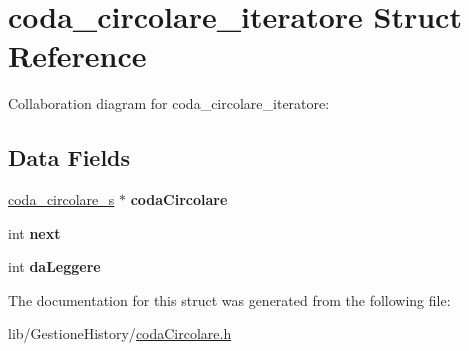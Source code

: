 \hypertarget{structcoda__circolare__iteratore}{}\section{coda\+\_\+circolare\+\_\+iteratore Struct Reference}
\label{structcoda__circolare__iteratore}


Collaboration diagram for coda\+\_\+circolare\+\_\+iteratore\+:
\subsection*{Data Fields}
\begin{DoxyCompactItemize}
\item 
\mbox{\label{structcoda__circolare__iteratore_adb37d558055c25504b8ec21a4388931b}} 
\hyperlink{structcoda__circolare}{coda\+\_\+circolare\+\_\+s} $\ast$ {\bfseries coda\+Circolare}
\item 
\mbox{\label{structcoda__circolare__iteratore_a142a1b51e133e50c0a72b175958ac412}} 
int {\bfseries next}
\item 
\mbox{\label{structcoda__circolare__iteratore_a94783a175f7daff3aee70a6a95983b48}} 
int {\bfseries da\+Leggere}
\end{DoxyCompactItemize}


The documentation for this struct was generated from the following file\+:\begin{DoxyCompactItemize}
\item 
lib/\+Gestione\+History/\hyperlink{coda_circolare_8h}{coda\+Circolare.\+h}\end{DoxyCompactItemize}
